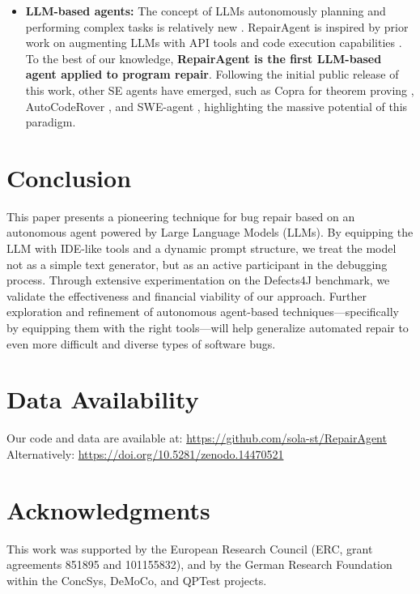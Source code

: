 \documentclass[manuscript,review]{acmart}
\begin{document}
\begin{itemize}
    \item \textbf{LLM-based agents:} The concept of LLMs autonomously planning and performing complex tasks is relatively new \cite{wang2023survey}. RepairAgent is inspired by prior work on augmenting LLMs with API tools \cite{mialon2023augmented, schick2023toolformer, patil2023gorilla} and code execution capabilities \cite{gao2022pal}. To the best of our knowledge, \textbf{RepairAgent is the first LLM-based agent applied to program repair}. Following the initial public release of this work, other SE agents have emerged, such as Copra for theorem proving \cite{thakur2024incontext}, AutoCodeRover \cite{zhang2024autocoderover}, and SWE-agent \cite{yang2024sweagent}, highlighting the massive potential of this paradigm.
\end{itemize}

\section{Conclusion}

This paper presents a pioneering technique for bug repair based on an autonomous agent powered by Large Language Models (LLMs). By equipping the LLM with IDE-like tools and a dynamic prompt structure, we treat the model not as a simple text generator, but as an active participant in the debugging process. Through extensive experimentation on the Defects4J benchmark, we validate the effectiveness and financial viability of our approach. Further exploration and refinement of autonomous agent-based techniques—specifically by equipping them with the right tools—will help generalize automated repair to even more difficult and diverse types of software bugs.

\section*{Data Availability}
Our code and data are available at: \url{https://github.com/sola-st/RepairAgent} \newline Alternatively: \url{https://doi.org/10.5281/zenodo.14470521}

\section*{Acknowledgments}
This work was supported by the European Research Council (ERC, grant agreements 851895 and 101155832), and by the German Research Foundation within the ConcSys, DeMoCo, and QPTest projects.



\end{document}
